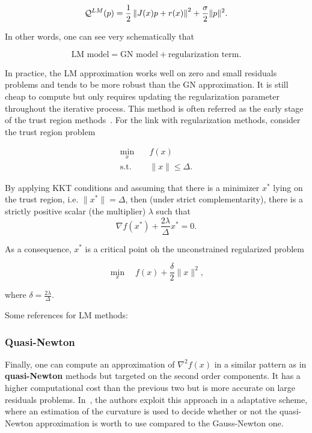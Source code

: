\documentclass[10pt]{article}
\numberwithin{equation}{section}
\begin{document}
	 \begin{equation}\label{eq:lm_model}
	 	{\mathcal{Q}}^{LM}(p) =  \dfrac{1}{2} \left\Vert J(x)p+r(x) \right\Vert^2 + \dfrac{\sigma}{2} \|p\|^2.
	 \end{equation}
	 
	 In other words, one can see very schematically that
	 
	\[\text{LM model} = \text{GN model} + \text{regularization term}.\]
	
	In practice, the LM approximation works well on zero and small residuals problems and tends to be more robust than the GN approximation. It is still cheap to compute but only requires updating the regularization parameter throughout the iterative process. This method is often referred as the early stage of the trust region methods~\cite{conn-etal:2000}. For the link with regularization methods, consider the trust region problem
	 
	 \begin{equation*}
	 	\begin{aligned}
	 		\min_x \quad & f(x) \\
	 		\text{s.t.} \quad & \|x\| \le \Delta.
	 	\end{aligned}
	 \end{equation*}
	 
	 By applying KKT conditions and assuming that there is a minimizer $x^*$ lying on the trust region, i.e. $\|x^*\|=\Delta$, then (under strict complementarity), there is a strictly positive scalar (the multiplier) $\lambda$ such that
	 \[\nabla f(x^*) + \dfrac{2\lambda}{\Delta}x^*=0.\]
	 
	 As a consequence, $x^*$ is a critical point oh the unconstrained regularized problem
	 
	 \[\min_x \quad f(x) + \dfrac{\delta}{2} \|x\|^2,\]
	 
	 where $\delta=\frac{2\lambda}{\Delta}$.
	 
	 Some references for LM methods: \cite{bellavia-etal:2018}
	 
	 \subsubsection{Quasi-Newton}
	 
	 Finally, one can compute an approximation of $\nabla^2f(x)$ in a similar pattern as in \textbf{quasi-Newton} methods \cite[][Chapter 6]{nocedalwright:2006} but targeted on the second order components. It has a higher computational cost than the previous two but is more accurate on large residuals problems. In~\cite{dennisetal:1981}, the authors exploit this approach in a adaptative scheme, where an estimation of the curvature is used to decide whether or not the quasi-Newton approximation is worth to use compared to the Gauss-Newton one.
	 
\end{document}
